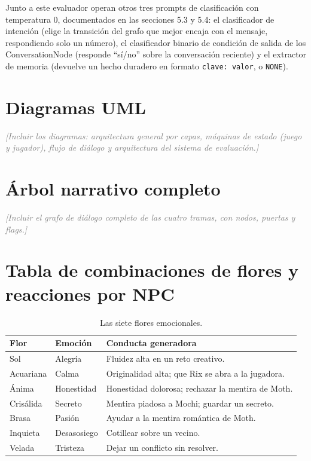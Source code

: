 \documentclass[12pt,twoside,titlepage]{report}
\begin{document}
Junto a este evaluador operan otros tres prompts de clasificación con temperatura 0, documentados en las secciones 5.3 y 5.4: el clasificador de intención (elige la transición del grafo que mejor encaja con el mensaje, respondiendo solo un número), el clasificador binario de condición de salida de los ConversationNode (responde ``sí/no'' sobre la conversación reciente) y el extractor de memoria (devuelve un hecho duradero en formato \texttt{clave: valor}, o \texttt{NONE}).

\chapter{Diagramas UML}
\textcolor{gray}{\textit{[Incluir los diagramas: arquitectura general por capas, máquinas de estado (juego y jugador), flujo de diálogo y arquitectura del sistema de evaluación.]}}

\chapter{Árbol narrativo completo}
\textcolor{gray}{\textit{[Incluir el grafo de diálogo completo de las cuatro tramas, con nodos, puertas y flags.]}}

\chapter{Tabla de combinaciones de flores y reacciones por NPC}
\label{anexo:flores}

\begin{table}[H]
  \centering
  \caption{Las siete flores emocionales.}
  \begin{footnotesize}
  \renewcommand{\arraystretch}{1.3}
  \begin{tabular}{p{2.4cm}p{2.6cm}p{7.6cm}}
    \hline
    \textbf{Flor} & \textbf{Emoción} & \textbf{Conducta generadora} \\
    \hline
    Sol & Alegría & Fluidez alta en un reto creativo. \\
    \hline
    Acuariana & Calma & Originalidad alta; que Rix se abra a la jugadora. \\
    \hline
    Ánima & Honestidad & Honestidad dolorosa; rechazar la mentira de Moth. \\
    \hline
    Crisálida & Secreto & Mentira piadosa a Mochi; guardar un secreto. \\
    \hline
    Brasa & Pasión & Ayudar a la mentira romántica de Moth. \\
    \hline
    Inquieta & Desasosiego & Cotillear sobre un vecino. \\
    \hline
    Velada & Tristeza & Dejar un conflicto sin resolver. \\
    \hline
  \end{tabular}
  \end{footnotesize}
\end{table}
\end{document}
